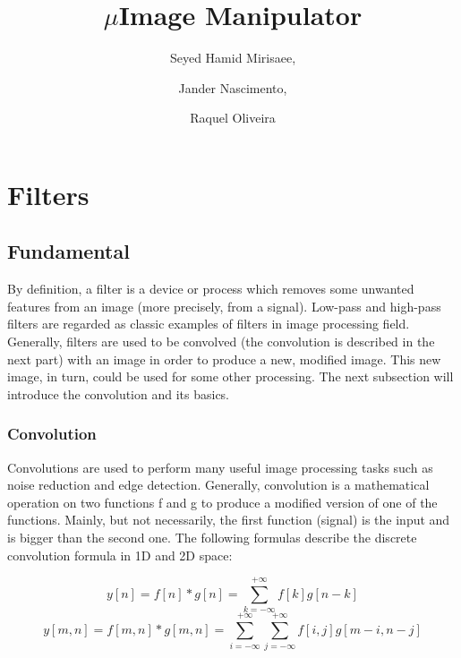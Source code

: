 \documentclass{article}
\begin{document}
\title{$\mu$Image Manipulator}

\author{Seyed Hamid Mirisaee,
\and Jander Nascimento, 
\and Raquel Oliveira}

\maketitle

\tableofcontents

\section{Filters}

	\subsection{Fundamental}

		By definition, a filter is a device or process which removes some unwanted features from an image (more precisely, from a signal).
		Low-pass and high-pass filters are regarded as  classic examples of filters in image processing field. Generally, filters are used to be convolved 
		(the convolution is described in the next part) with an image in order to produce a new, modified image. This new image, in turn, could
		be used for some other processing. The next subsection will introduce the convolution and its basics.
		
		\subsubsection{Convolution}

			Convolutions are used to perform many useful image processing tasks such as noise reduction and edge detection. Generally,
			convolution is a mathematical operation on two functions f and g to produce a modified version of one of the functions.
			Mainly, but not necessarily, the first function (signal) is the input and is bigger than the second one.
			The following formulas describe the discrete convolution formula in 1D and 2D space:

			\begin{equation}
			y[n] = f[n]*g[n] = \sum_{k=-\infty}^{+\infty} f[k]g[n-k]
			\end{equation}
			\begin{equation}
			y[m,n] = f[m,n]*g[m,n] = \sum_{i=-\infty}^{+\infty}\sum_{j=-\infty}^{+\infty}f[i,j]g[m-i,n-j]
			\end{equation}
\end{document}
